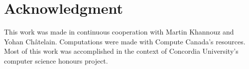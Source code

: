 \documentclass[conference]{IEEEtran}
\begin{document}
\section*{Acknowledgment}

This work was made in continuous cooperation with Martin Khannouz and Yohan
Châtelain. Computations were made with Compute Canada's resources. Most of this
work was accomplished in the context of Concordia University's computer science
honours project.




\vspace{12pt}
\end{document}

